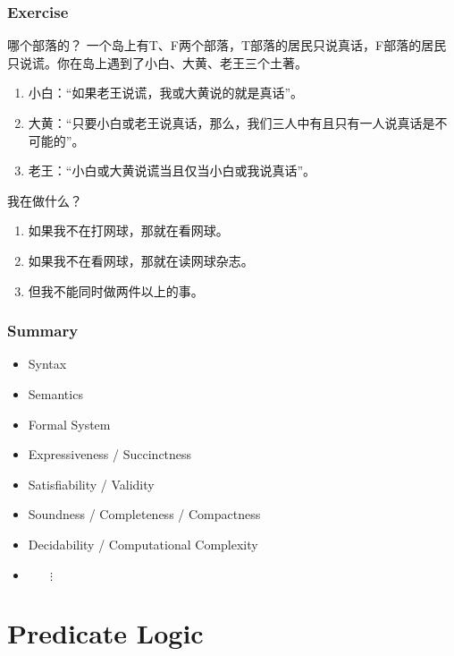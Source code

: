 \documentclass[UTF8,11pt,colorlinks,compress,openany]{beamer}%
\begin{document}
\begin{frame}\frametitle{Exercise}
		\begin{block}{哪个部落的？}
		一个岛上有T、F两个部落，T部落的居民只说真话，F部落的居民只说谎。你在岛上遇到了小白、大黄、老王三个土著。
			\begin{enumerate}
				\item 小白：“如果老王说谎，我或大黄说的就是真话”。
				\item 大黄：“只要小白或老王说真话，那么，我们三人中有且只有一人说真话是不可能的”。
				\item 老王：“小白或大黄说谎当且仅当小白或我说真话”。
			\end{enumerate}
		\end{block}
		\begin{block}{我在做什么？}
			\begin{enumerate}
				\item 如果我不在打网球，那就在看网球。
				\item 如果我不在看网球，那就在读网球杂志。
				\item 但我不能同时做两件以上的事。
			\end{enumerate}
		\end{block}
\end{frame}

\begin{frame}\frametitle{Summary}
	\begin{itemize}
		\item Syntax
		\item Semantics
		\item Formal System
	\end{itemize}
	\begin{itemize}
		\item Expressiveness / Succinctness
		\item Satisfiability / Validity
		\item Soundness / Completeness / Compactness
		\item Decidability / Computational Complexity
		\item $\phantom{Dec}\vdots$
	\end{itemize}
\end{frame}


\section{Predicate Logic}
\end{document}
